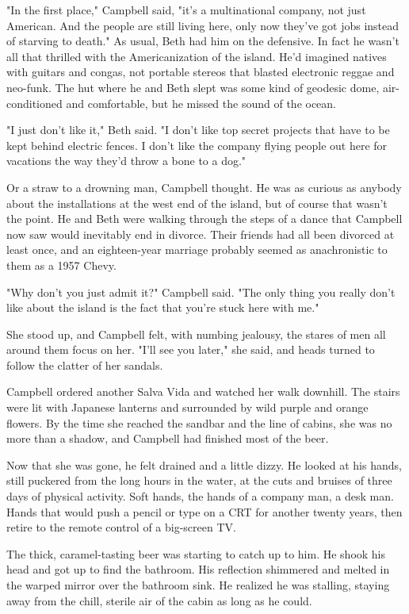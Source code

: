 "In the first place," Campbell said, "it's a multinational company, not just American. And the people are still living here, only now they've got jobs instead of starving to death." As usual, Beth had him on the defensive. In fact he wasn't all that thrilled with the Americanization of the island. He'd imagined natives with guitars and congas, not portable stereos that blasted electronic reggae and neo-funk. The hut where he and Beth slept was some kind of geodesic dome, air-conditioned and comfortable, but he missed the sound of the ocean.

"I just don't like it," Beth said. "I don't like top secret projects that have to be kept behind electric fences. I don't like the company flying people out here for vacations the way they'd throw a bone to a dog."

Or a straw to a drowning man, Campbell thought. He was as curious as anybody about the installations at the west end of the island, but of course that wasn't the point. He and Beth were walking through the steps of a dance that Campbell now saw would inevitably end in divorce. Their friends had all been divorced at least once, and an eighteen-year marriage probably seemed as anachronistic to them as a 1957 Chevy.

"Why don't you just admit it?" Campbell said. "The only thing you really don't like about the island is the fact that you're stuck here with me."

She stood up, and Campbell felt, with numbing jealousy, the stares of men all around them focus on her. "I'll see you later," she said, and heads turned to follow the clatter of her sandals.

Campbell ordered another Salva Vida and watched her walk downhill. The stairs were lit with Japanese lanterns and surrounded by wild purple and orange flowers. By the time she reached the sandbar and the line of cabins, she was no more than a shadow, and Campbell had finished most of the beer.

Now that she was gone, he felt drained and a little dizzy. He looked at his hands, still puckered from the long hours in the water, at the cuts and bruises of three days of physical activity. Soft hands, the hands of a company man, a desk man. Hands that would push a pencil or type on a CRT for another twenty years, then retire to the remote control of a big-screen TV.

The thick, caramel-tasting beer was starting to catch up to him. He shook his head and got up to find the bathroom. His reflection shimmered and melted in the warped mirror over the bathroom sink. He realized he was stalling, staying away from the chill, sterile air of the cabin as long as he could.

